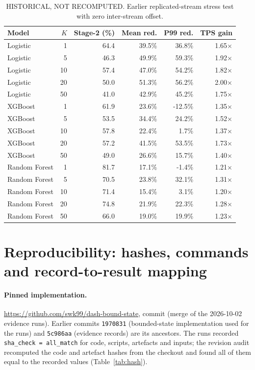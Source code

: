 \documentclass[10pt,a4paper]{article}
\begin{document}
\begin{table}[h]\centering\small
\caption{HISTORICAL, NOT RECOMPUTED. Earlier replicated-stream stress test with zero inter-stream offset.}
\begin{tabular*}{\linewidth}{@{\extracolsep{\fill}}l r r r r r@{}}
\toprule
Model & $K$ & Stage-2 (\%) & Mean red. & P99 red. & TPS gain \\
\midrule
Logistic & 1 & 64.4 & 39.5\% & 36.8\% & 1.65$\times$ \\
Logistic & 5 & 46.3 & 49.9\% & 59.3\% & 1.92$\times$ \\
Logistic & 10 & 57.4 & 47.0\% & 54.2\% & 1.82$\times$ \\
Logistic & 20 & 50.0 & 51.3\% & 56.2\% & 2.00$\times$ \\
Logistic & 50 & 41.0 & 42.9\% & 45.2\% & 1.75$\times$ \\
XGBoost & 1 & 61.9 & 23.6\% & -12.5\% & 1.35$\times$ \\
XGBoost & 5 & 53.5 & 34.4\% & 24.2\% & 1.52$\times$ \\
XGBoost & 10 & 57.8 & 22.4\% & 1.7\% & 1.37$\times$ \\
XGBoost & 20 & 57.2 & 41.5\% & 53.5\% & 1.73$\times$ \\
XGBoost & 50 & 49.0 & 26.6\% & 15.7\% & 1.40$\times$ \\
Random Forest & 1 & 81.7 & 17.1\% & -1.4\% & 1.21$\times$ \\
Random Forest & 5 & 70.5 & 23.8\% & 32.1\% & 1.31$\times$ \\
Random Forest & 10 & 71.4 & 15.4\% & 3.1\% & 1.20$\times$ \\
Random Forest & 20 & 74.8 & 21.9\% & 22.3\% & 1.28$\times$ \\
Random Forest & 50 & 66.0 & 19.0\% & 19.9\% & 1.23$\times$ \\
\bottomrule
\end{tabular*}
\end{table}
\clearpage

\section{Reproducibility: hashes, commands and record-to-result mapping}
\label{sec:repro}
\paragraph{Pinned implementation.} \url{https://github.com/swk99/dash-bound-state}, commit  (merge of the 2026-10-02 evidence runs). Earlier commits \texttt{1970831} (bounded-state implementation used for the runs) and \texttt{5c986aa} (evidence records) are its ancestors. The runs recorded \texttt{sha\_check = all\_match} for code, scripts, artefacts and inputs; the revision audit recomputed the code and artefact hashes from the checkout and found all of them equal to the recorded values (Table~\ref{tab:hash}).
\end{document}
